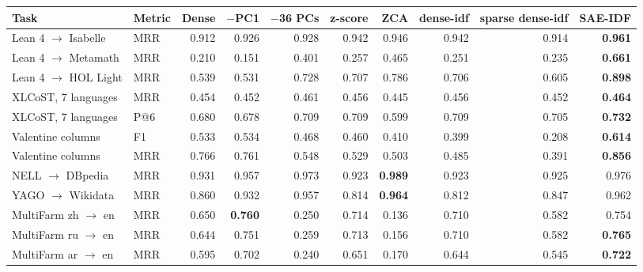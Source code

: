 \begin{tabular}{@{}llrrrrrrrr@{}}
\toprule
Task & Metric & Dense & $-$PC1 & $-$36 PCs & z-score & ZCA & dense-idf & sparse dense-idf & \textbf{SAE-IDF} \\
\midrule
Lean 4 $\to$ Isabelle & MRR & 0.912 & 0.926 & 0.928 & 0.942 & 0.946 & 0.942 & 0.914 & \textbf{0.961} \\
Lean 4 $\to$ Metamath & MRR & 0.210 & 0.151 & 0.401 & 0.257 & 0.465 & 0.251 & 0.235 & \textbf{0.661} \\
Lean 4 $\to$ HOL Light & MRR & 0.539 & 0.531 & 0.728 & 0.707 & 0.786 & 0.706 & 0.605 & \textbf{0.898} \\
XLCoST, 7 languages & MRR & 0.454 & 0.452 & 0.461 & 0.456 & 0.445 & 0.456 & 0.452 & \textbf{0.464} \\
XLCoST, 7 languages & P@6 & 0.680 & 0.678 & 0.709 & 0.709 & 0.599 & 0.709 & 0.705 & \textbf{0.732} \\
Valentine columns & F1 & 0.533 & 0.534 & 0.468 & 0.460 & 0.410 & 0.399 & 0.208 & \textbf{0.614} \\
Valentine columns & MRR & 0.766 & 0.761 & 0.548 & 0.529 & 0.503 & 0.485 & 0.391 & \textbf{0.856} \\
NELL $\to$ DBpedia & MRR & 0.931 & 0.957 & 0.973 & 0.923 & \textbf{0.989} & 0.923 & 0.925 & 0.976 \\
YAGO $\to$ Wikidata & MRR & 0.860 & 0.932 & 0.957 & 0.814 & \textbf{0.964} & 0.812 & 0.847 & 0.962 \\
MultiFarm zh $\to$ en & MRR & 0.650 & \textbf{0.760} & 0.250 & 0.714 & 0.136 & 0.710 & 0.582 & 0.754 \\
MultiFarm ru $\to$ en & MRR & 0.644 & 0.751 & 0.259 & 0.713 & 0.156 & 0.710 & 0.582 & \textbf{0.765} \\
MultiFarm ar $\to$ en & MRR & 0.595 & 0.702 & 0.240 & 0.651 & 0.170 & 0.644 & 0.545 & \textbf{0.722} \\
\bottomrule
\end{tabular}
